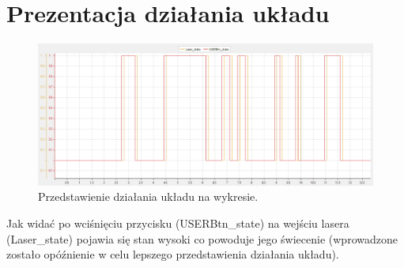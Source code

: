 \documentclass[11pt, a4paper]{article}
\begin{document}
\section{Prezentacja działania układu}

\vspace{0.5cm}
\begin{figure}[h!]
    \centering
    \includegraphics[width=1\textwidth]{fig/laser/SWV.png}
    \caption{Przedstawienie działania układu na wykresie.}
    \label{fig:my_label}
\end{figure}

Jak widać po wciśnięciu przycisku (USERBtn\_state) na wejściu lasera (Laser\_state) pojawia się stan wysoki co powoduje jego świecenie (wprowadzone zostało opóźnienie w celu lepszego przedstawienia działania układu).

\newpage
\end{document}

